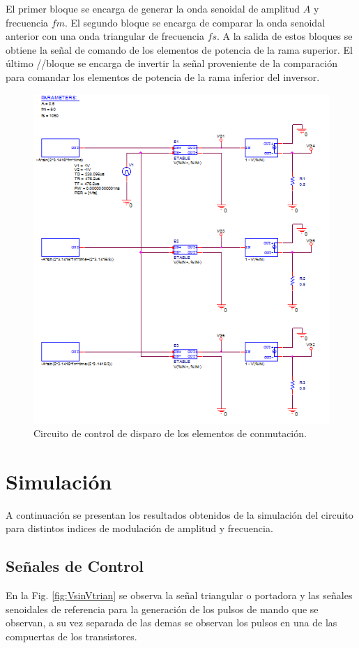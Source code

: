 \documentclass[11pt, a4paper]{article}
\begin{document}
El primer bloque se encarga de generar la onda senoidal de amplitud $A$ y frecuencia $fm$. El segundo bloque se encarga de comparar la onda senoidal anterior con una onda triangular de frecuencia $fs$. A la salida de estos bloques se obtiene la señal de comando de los elementos de potencia de la rama superior. El último //bloque se encarga de invertir la señal proveniente de la comparación para comandar los elementos de potencia de la rama inferior del inversor.
\begin{figure}[h!]
	\centering
	\includegraphics[width=15cm]{Imagen/Disparo}
	\caption{Circuito de control de disparo de los elementos de conmutación.}
	\label{fig:control}
\end{figure}



\newpage


\section{Simulación}
A continuación se presentan los resultados obtenidos de la simulación del circuito para distintos indices de modulación de amplitud y frecuencia.

\subsection{Señales de Control}
En la Fig. \ref{fig:VsinVtrian} se observa la señal triangular o portadora y las señales senoidales de referencia para la generación de los pulsos de mando que se observan, a su vez separada de las demas se observan los pulsos en una de las compuertas de los transistores.
 
\end{document}
